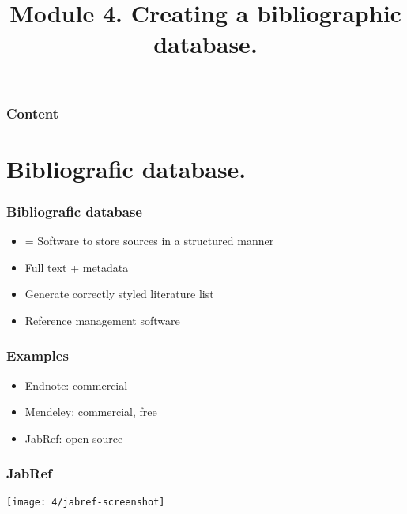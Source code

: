 \documentclass[aspectratio=169]{beamer}
\title{Module 4. Creating a bibliographic database.}
\subtitle{\coursename}
\author{\lecturers}   %
\date{\academicyear}
\begin{document}
\begin{frame}
  \maketitle
\end{frame}

\begin{frame}
  \frametitle{Content}

  \tableofcontents
\end{frame}

\section{Bibliografic database.}

\begin{frame}
  \frametitle{Bibliografic database}

  \begin{itemize}
    \item = Software to store sources in a structured manner
    \item Full text + metadata
    \item Generate correctly styled literature list
    \item Reference management software
  \end{itemize}
\end{frame}

\begin{frame}
  \frametitle{Examples}

  \begin{itemize}
    \item Endnote: commercial
    \item Mendeley: commercial, free
    \item JabRef: open source
  \end{itemize}

\end{frame}

\begin{frame}[plain]
  \frametitle{JabRef}

  \centering
  \texttt{[image: 4/jabref-screenshot]}

\end{frame}
\end{document}
